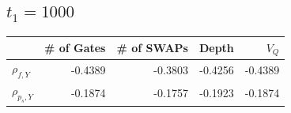 \documentclass[11pt]{article}
\begin{document}
\subsection{\(t_1=1000\)}
\label{sec:orgadf6805}

\begin{center}
\begin{tabular}{lrrrr}
 & \# of Gates & \# of SWAPs & Depth & \(V_Q\)\\
\hline
\(\rho _{f,Y}\) & -0.4389 & -0.3803 & -0.4256 & -0.4389\\
\(\rho _{p_s,Y}\) & -0.1874 & -0.1757 & -0.1923 & -0.1874\\
\hline
\end{tabular}
\end{center}
\end{document}
